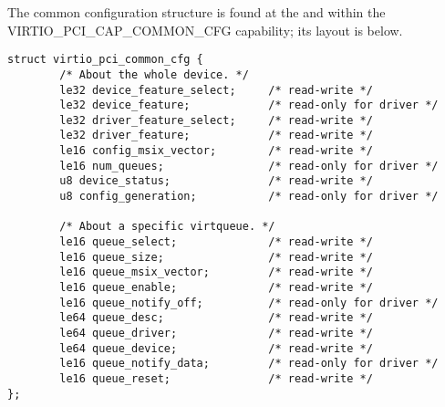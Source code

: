 The common configuration structure is found at the  and  within the VIRTIO_PCI_CAP_COMMON_CFG capability; its layout is below.

\begin{lstlisting}
struct virtio_pci_common_cfg {
        /* About the whole device. */
        le32 device_feature_select;     /* read-write */
        le32 device_feature;            /* read-only for driver */
        le32 driver_feature_select;     /* read-write */
        le32 driver_feature;            /* read-write */
        le16 config_msix_vector;        /* read-write */
        le16 num_queues;                /* read-only for driver */
        u8 device_status;               /* read-write */
        u8 config_generation;           /* read-only for driver */

        /* About a specific virtqueue. */
        le16 queue_select;              /* read-write */
        le16 queue_size;                /* read-write */
        le16 queue_msix_vector;         /* read-write */
        le16 queue_enable;              /* read-write */
        le16 queue_notify_off;          /* read-only for driver */
        le64 queue_desc;                /* read-write */
        le64 queue_driver;              /* read-write */
        le64 queue_device;              /* read-write */
        le16 queue_notify_data;         /* read-only for driver */
        le16 queue_reset;               /* read-write */
};
\end{lstlisting}


